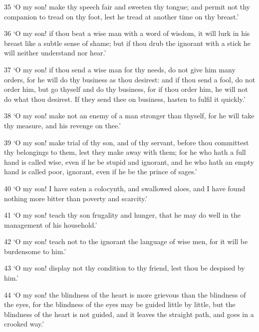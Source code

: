 \par 35 ‘O my son! make thy speech fair and sweeten thy tongue; and permit not thy companion to tread on thy foot, lest he tread at another time on thy breast.’

\par 36 ‘O my son! if thou beat a wise man with a word of wisdom, it will lurk in his breast like a subtle sense of shame; but if thou drub the ignorant with a stick he will neither understand nor hear.’

\par 37 ‘O my son! if thou send a wise man for thy needs, do not give him many orders, for he will do thy business as thou desirest: and if thou send a fool, do not order him, but go thyself and do thy business, for if thou order him, he will not do what thou desirest. If they send thee on business, hasten to fulfil it quickly.’

\par 38 ‘O my son! make not an enemy of a man stronger than thyself, for he will take thy measure, and his revenge on thee.’

\par 39 ‘O my son! make trial of thy son, and of thy servant, before thou committest thy belongings to them, lest they make away with them; for he who hath a full hand is called wise, even if he be stupid and ignorant, and he who hath an empty hand is called poor, ignorant, even if he be the prince of sages.’

\par 40 ‘O my son! I have eaten a colocynth, and swallowed aloes, and I have found nothing more bitter than poverty and scarcity.’

\par 41 ‘O my son! teach thy son frugality and hunger, that he may do well in the management of his household.’

\par 42 ‘O my son! teach not to the ignorant the language of wise men, for it will be burdensome to him.’

\par 43 ‘O my son! display not thy condition to thy friend, lest thou be despised by him.’

\par 44 ‘O my son! the blindness of the heart is more grievous than the blindness of the eyes, for the blindness of the eyes may be guided little by little, but the blindness of the heart is not guided, and it leaves the straight path, and goes in a crooked way.’

